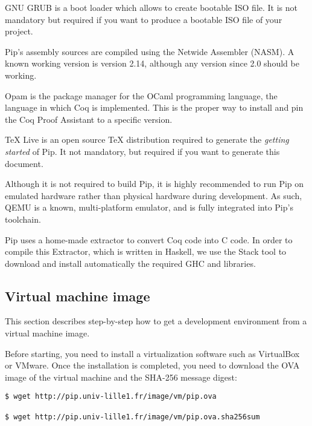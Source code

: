\documentclass[10pt,a4paper,titlepage]{refart}
\begin{document}
 
GNU GRUB is a boot loader which allows to create bootable ISO file. It is not
mandatory but required if you want to produce a bootable ISO file of your
project.

 
Pip's assembly sources are compiled using the Netwide Assembler (NASM). A known
working version is version 2.14, although any version since 2.0 should be
working.

 
Opam is the package manager for the OCaml programming language, the language in
which Coq is implemented. This is the proper way to install and pin the Coq
Proof Assistant to a specific version.

 
TeX Live is an open source TeX distribution required to generate the
\textit{getting started} of Pip. It not mandatory, but required if you want to
generate this document.

 
Although it is not required to build Pip, it is highly recommended to run Pip on
emulated hardware rather than physical hardware during development. As such,
QEMU is a known, multi-platform emulator, and is fully integrated into Pip's
toolchain.

 
Pip uses a home-made extractor to convert Coq code into C code. In order to
compile this Extractor, which is written in Haskell, we use the Stack tool to
download and install automatically the required GHC and libraries.

\subsection{Virtual machine image}

This section describes step-by-step how to get a development environment from a
virtual machine image.

Before starting, you need to install a virtualization software such as
VirtualBox or VMware. Once the installation is completed, you need to download
the OVA image of the virtual machine and the SHA-256 message digest:

\begin{lstlisting}[style=BashStyle]
$ wget http://pip.univ-lille1.fr/image/vm/pip.ova

$ wget http://pip.univ-lille1.fr/image/vm/pip.ova.sha256sum
\end{lstlisting}
\end{document}
